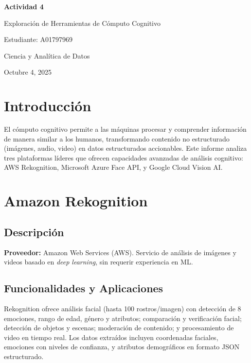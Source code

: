 \documentclass[12pt,a4paper]{article}
\begin{document}
\begin{titlepage}
    \centering
    \vspace*{2cm}
    {\LARGE\bfseries Actividad 4\par}
    \vspace{0.5cm}
    {\Large Exploración de Herramientas de Cómputo Cognitivo\par}
    \vspace{2cm}
    {\large Estudiante: A01797969\par}
    \vspace{0.5cm}
    {\large Ciencia y Analítica de Datos\par}
    \vfill
    {\large Octubre 4, 2025\par}
\end{titlepage}

\section{Introducción}

El cómputo cognitivo permite a las máquinas procesar y comprender información de manera similar a los humanos, transformando contenido no estructurado (imágenes, audio, video) en datos estructurados accionables. Este informe analiza tres plataformas líderes que ofrecen capacidades avanzadas de análisis cognitivo: AWS Rekognition, Microsoft Azure Face API, y Google Cloud Vision AI.

\section{Amazon Rekognition}

\subsection{Descripción}
\textbf{Proveedor:} Amazon Web Services (AWS). Servicio de análisis de imágenes y videos basado en \textit{deep learning}, sin requerir experiencia en ML.

\subsection{Funcionalidades y Aplicaciones}
Rekognition ofrece análisis facial (hasta 100 rostros/imagen) con detección de 8 emociones, rango de edad, género y atributos; comparación y verificación facial; detección de objetos y escenas; moderación de contenido; y procesamiento de video en tiempo real. Los datos extraídos incluyen coordenadas faciales, emociones con niveles de confianza, y atributos demográficos en formato JSON estructurado.
\end{document}
